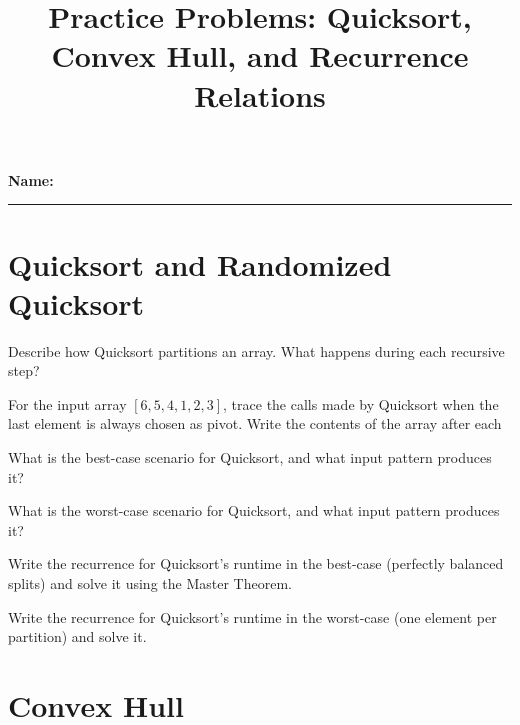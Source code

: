 \documentclass[12pt]{exam}
\begin{document}
\title{Practice Problems: Quicksort, Convex Hull, and Recurrence Relations}
\date{}
\maketitle

\vspace{0.3in}
\noindent\textbf{Name:} \rule{4in}{0.4pt}

\vspace{0.3in}

\begin{questions}


\section*{Quicksort and Randomized Quicksort}

\question[4] Describe how Quicksort partitions an array. What happens during each recursive step?

\vspace{1.2in}

\question[4] For the input array \([6, 5, 4, 1, 2, 3]\), trace the calls made by Quicksort when the last element is always chosen as pivot. Write the contents of the array after each 

\vspace{2in}

\question[4] What is the best-case scenario for Quicksort, and what input pattern produces it?

\vspace{1in}

\question[4] What is the worst-case scenario for Quicksort, and what input pattern produces it?

\vspace{1in}

\question[4] Write the recurrence for Quicksort's runtime in the best-case (perfectly balanced splits) and solve it using the Master Theorem.

\vspace{1.5in}

\question[4] Write the recurrence for Quicksort's runtime in the worst-case (one element per partition) and solve it.



\newpage
\section*{Convex Hull}


\end{questions}
\end{document}
